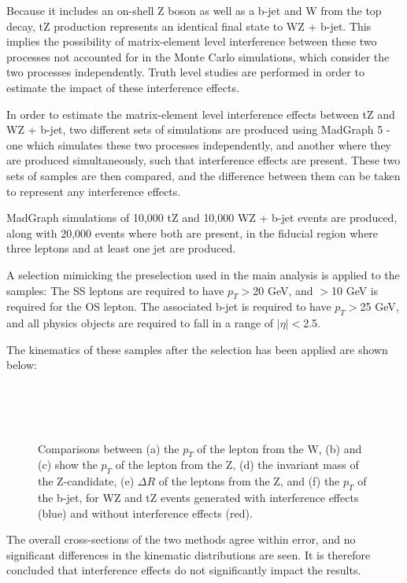 Because it includes an on-shell Z boson as well as a b-jet and W from the top decay, tZ production represents an identical final state  to WZ + b-jet. This implies the possibility of matrix-element level interference between these two processes not accounted for in the Monte Carlo simulations, which consider the two processes independently. Truth level studies are performed in order to estimate the impact of these interference effects.    

In order to estimate the matrix-element level interference effects between tZ and WZ + b-jet, two different sets of simulations are produced using MadGraph 5 \cite{Frederix_2018} - one which simulates these two processes independently, and another where they are  produced simultaneously, such that interference effects are present. These two sets of samples are then compared, and the difference between them can be taken to represent any interference effects.

MadGraph simulations of 10,000 tZ and 10,000 WZ + b-jet events are produced, along with 20,000 events where both are present, in the fiducial region where three leptons and at least one jet are produced.  

A selection mimicking the preselection used in the main analysis is applied to the samples: The SS leptons are required to have $p_T>$20 GeV, and $>$10 GeV is required for the OS lepton. The associated b-jet is required to have $p_T>$25 GeV, and all physics objects are required to fall in a range of $|\eta|<$2.5. 

The kinematics of these samples after the selection has been applied are shown below:

\begin{figure}[H]
    \\
    \\
    \\
    \caption{Comparisons between (a) the $p_T$ of the lepton from the W, (b) and (c) show the $p_T$ of the lepton from the Z, (d)  the invariant mass of the Z-candidate, (e) $\Delta R$ of the leptons from the Z, and (f) the $p_T$ of the b-jet, for WZ and tZ events generated with interference effects (blue) and without interference effects (red).}
\end{figure}

The overall cross-sections of the two methods agree within error, and no significant differences in the kinematic distributions are seen. It is therefore concluded that interference effects do not significantly impact the results.
